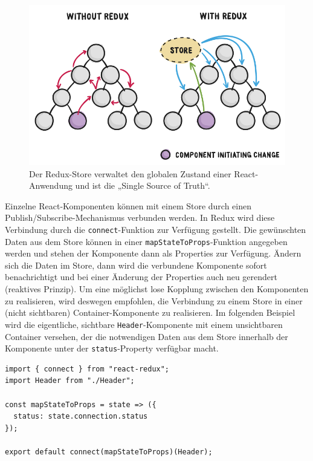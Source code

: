 \begin{figure}[H]
    \includegraphics[width=12cm]{chapter/entwurf/bilder/BA_redux.png}
    \centering
    \caption[Redux Dataflow]{Der Redux-Store verwaltet den globalen Zustand einer React-Anwendung und ist die „Single Source of Truth“.\protect\footnotemark}

    \label{abb:redux_flow}
\end{figure}



Einzelne React-Komponenten können mit einem Store durch einen Publish/Subscribe-Mechanismus verbunden werden. In Redux wird diese Verbindung durch die \texttt{connect}-Funktion zur Verfügung gestellt. Die gewünschten Daten aus dem Store können in einer \texttt{mapStateToProps}-Funktion angegeben werden und stehen der Komponente dann als Properties zur Verfügung. Ändern sich die Daten im Store, dann wird die verbundene Komponente sofort benachrichtigt und bei einer Änderung der Properties auch neu gerendert (reaktives Prinzip). Um eine möglichst lose Kopplung zwischen den Komponenten zu realisieren, wird deswegen empfohlen, die Verbindung zu einem Store in einer (nicht sichtbaren) Container-Komponente zu realisieren. Im folgenden Beispiel wird die eigentliche, sichtbare \texttt{Header}-Komponente mit einem unsichtbaren Container versehen, der die notwendigen Daten aus dem Store innerhalb der Komponente unter der \texttt{status}-Property verfügbar macht.

\begin{minipage}{\linewidth}
\begin{lstlisting}[caption={Über den connect-Aufruf beim Exportieren der Komponente wird sie mit dem Store verbunden. (aus:  src/client/components/ClientHeaderContainer.js)}]
import { connect } from "react-redux";
import Header from "./Header";

const mapStateToProps = state => ({
  status: state.connection.status
});

export default connect(mapStateToProps)(Header);
\end{lstlisting}
\end{minipage}

